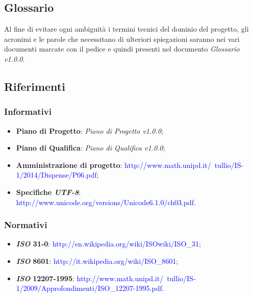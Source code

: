 \subsection{Glossario}
Al fine di evitare ogni ambiguità i termini tecnici del dominio del progetto, gli acronimi e le parole che necessitano di ulteriori spiegazioni saranno nei vari documenti marcate con il pedice  e quindi presenti nel documento \textit{Glossario v1.0.0}.

\subsection{Riferimenti}
\subsubsection{Informativi}
\begin{itemize}
\item
\textbf{Piano di Progetto}: \textit{Piano di Progetto v1.0.0};
\item
\textbf{Piano di Qualifica}: \textit{Piano di Qualifica v1.0.0};
\item
\textbf{Amministrazione di progetto}: \textcolor{blue} {http://www.math.unipd.it/~tullio/IS-1/2014/Dispense/P06.pdf};
\item
\textbf{Specifiche \textit{UTF-8}}: \textcolor{blue}{http://www.unicode.org/versions/Unicode6.1.0/ch03.pdf}.
\end{itemize}

\subsubsection{Normativi}
\begin{itemize}
\item
\textbf{\textit{ISO} 31-0}: \textcolor{blue}{http://en.wikipedia.org/wiki/ISOwiki/ISO\_31};
\item
\textbf{\textit{ISO}} \textbf{8601}: \textcolor{blue}{http://it.wikipedia.org/wiki/ISO\_8601};
\item
\textbf{\textit{ISO}} \textbf{12207-1995}: \textcolor{blue} {http://www.math.unipd.it/~tullio/IS-1/2009/Approfondimenti/ISO\_12207-1995.pdf}.

\end{itemize}